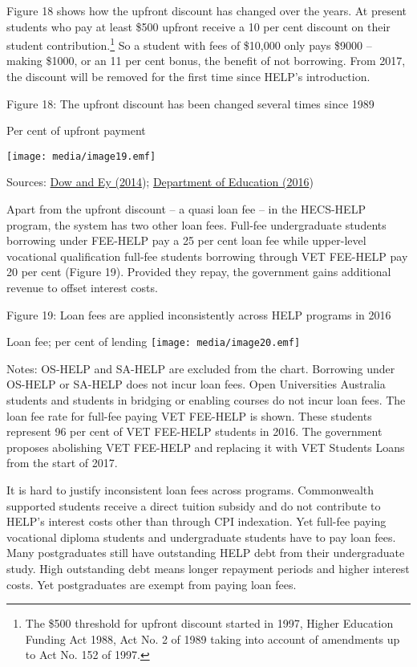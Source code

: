 \documentclass[]{book}
\begin{document}
Figure 18 shows how the upfront discount has changed over the years. At present students who pay at least \$500 upfront receive a 10 per cent discount on their student contribution.\footnote{The \$500 threshold for upfront discount started in 1997, Higher Education Funding Act 1988, Act No. 2 of 1989 taking into account of amendments up to Act No. 152 of 1997.} So a student with fees of \$10,000 only pays \$9000 -- making \$1000, or an 11 per cent bonus, the benefit of not borrowing. From 2017, the discount will be removed for the first time since HELP's introduction.

\protect\hypertarget{_Ref314565373}{}{}Figure 18: The upfront discount has been changed several times since 1989

Per cent of upfront payment

\texttt{[image: media/image19.emf]}

Sources: \protect\hyperlink{_ENREF_39}{Dow and Ey (2014}); \protect\hyperlink{_ENREF_22}{Department of Education (2016})

Apart from the upfront discount -- a quasi loan fee -- in the HECS-HELP program, the system has two other loan fees. Full-fee undergraduate students borrowing under FEE-HELP pay a 25 per cent loan fee while upper-level vocational qualification full-fee students borrowing through VET FEE-HELP pay 20 per cent (Figure 19). Provided they repay, the government gains additional revenue to offset interest costs.

\protect\hypertarget{_Ref320958901}{}{}Figure 19: Loan fees are applied inconsistently across HELP programs in 2016

Loan fee; per cent of lending \texttt{[image: media/image20.emf]}

Notes: OS-HELP and SA-HELP are excluded from the chart. Borrowing under OS-HELP or SA-HELP does not incur loan fees. Open Universities Australia students and students in bridging or enabling courses do not incur loan fees. The loan fee rate for full-fee paying VET FEE-HELP is shown. These students represent 96 per cent of VET FEE-HELP students in 2016. The government proposes abolishing VET FEE-HELP and replacing it with VET Students Loans from the start of 2017.

It is hard to justify inconsistent loan fees across programs. Commonwealth supported students receive a direct tuition subsidy and do not contribute to HELP's interest costs other than through CPI indexation. Yet full-fee paying vocational diploma students and undergraduate students have to pay loan fees. Many postgraduates still have outstanding HELP debt from their undergraduate study. High outstanding debt means longer repayment periods and higher interest costs. Yet postgraduates are exempt from paying loan fees.
\end{document}
